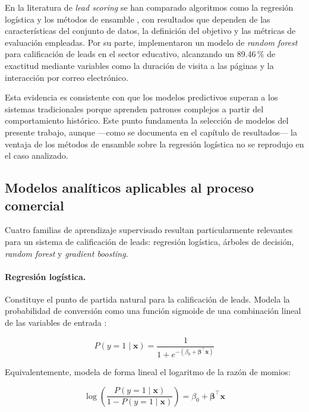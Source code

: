 En la literatura de \emph{lead scoring} se han comparado algoritmos como la
regresión logística y los métodos de ensamble \cite{nygard2020automating}, con
resultados que dependen de las características del conjunto de datos, la
definición del objetivo y las métricas de evaluación empleadas. Por su parte,
 implementaron un modelo de \emph{random forest} para
calificación de leads en el sector educativo, alcanzando un 89.46\,\% de exactitud
mediante variables como la duración de visita a las páginas y la interacción por
correo electrónico.

Esta evidencia es consistente con que los modelos predictivos superan a los
sistemas tradicionales porque aprenden patrones complejos a partir del
comportamiento histórico. Este punto fundamenta la selección de modelos del
presente trabajo,
aunque —como se documenta en el capítulo de resultados— la ventaja de los métodos
de ensamble sobre la regresión logística no se reprodujo en el caso analizado.

\subsection{Modelos analíticos aplicables al proceso comercial}

Cuatro familias de aprendizaje supervisado resultan particularmente relevantes para
un sistema de calificación de leads: regresión logística, árboles de decisión,
\emph{random forest} y \emph{gradient boosting}.

\paragraph{Regresión logística.} Constituye el punto de partida natural para la
calificación de leads. Modela la probabilidad de conversión como una función
sigmoide de una combinación lineal de las variables de entrada
\cite{hosmer2013applied}:

\begin{equation}
P(y=1 \mid \mathbf{x}) = \frac{1}{1 + e^{-(\beta_0 + \boldsymbol{\beta}^{\top}\mathbf{x})}}
\end{equation}

Equivalentemente, modela de forma lineal el logaritmo de la razón de momios:

\begin{equation}
\log\left(\frac{P(y=1 \mid \mathbf{x})}{1 - P(y=1 \mid \mathbf{x})}\right)
= \beta_0 + \boldsymbol{\beta}^{\top}\mathbf{x}
\end{equation}


